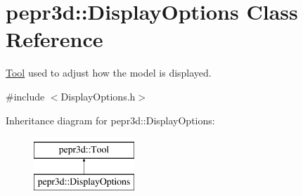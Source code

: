 \hypertarget{classpepr3d_1_1_display_options}{}\section{pepr3d\+::Display\+Options Class Reference}
\label{classpepr3d_1_1_display_options}


\mbox{\hyperlink{classpepr3d_1_1_tool}{Tool}} used to adjust how the model is displayed.  




{\ttfamily \#include $<$Display\+Options.\+h$>$}

Inheritance diagram for pepr3d\+::Display\+Options\+:\begin{figure}[H]
\begin{center}
\leavevmode
\includegraphics[height=2.000000cm]{classpepr3d_1_1_display_options}
\end{center}
\end{figure}
